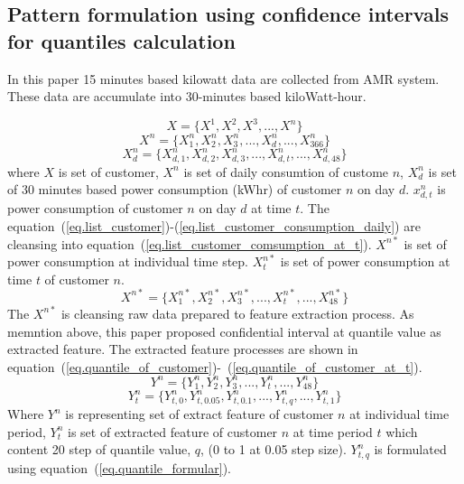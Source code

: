 \documentclass[conference]{IEEEtran}
\begin{document}
\subsection{Pattern formulation using confidence intervals for quantiles calculation}
In this paper 15 minutes based kilowatt data are collected from AMR system. These data are accumulate into 30-minutes based kiloWatt-hour.

\begin{equation}
X=\big\{ X^{1}, X^{2}, X^{3}, ..., X^{n} \big\}
\label{eq.list_customer}
\end{equation}
\begin{equation}
X^{n}=\big\{ X_{1}^{n}, X_{2}^{n}, X_{3}^{n}, ...,X_{d}^{n},..., X_{366}^{n}\big\}
\label{eq.list_customer_consumption}
\end{equation}
\begin{equation}
X_{d}^{n}=\big\{ X_{d,1}^{n}, X_{d,2}^{n}, X_{d,3}^{n}, ...,X_{d,t}^{n},..., X_{d,48}^{n}\big\}
\label{eq.list_customer_consumption_daily}
\end{equation}
where $X$ is set of customer, $X^{n}$ is set of daily consumtion of custome $n$, $X_{d}^n$ is set of 30 minutes based power consumption (kWhr) of customer $n$ on day $d$. $x_{d,t}^{n}$ is power consumption of customer $n$ on day $d$ at time $t$.
The equation~(\ref{eq.list_customer})-(\ref{eq.list_customer_consumption_daily}) are cleansing into equation~(\ref{eq.list_customer_comsumption_at_t}).
$X^{n*}$ is set of power consumption at individual time step. $X_{t}^{n*}$ is set of power consumption at time $t$ of customer $n$.
\begin{equation}
X^{n*}=\big\{ X_{1}^{n*}, X_{2}^{n*}, X_{3}^{n*}, ..., X_{t}^{n*}, ..., X_{48}^{n*} \big\}
\label{eq.list_customer_comsumption_at_t}
\end{equation}
The $X^{n*}$ is cleansing raw data prepared to feature extraction process. As memntion above, this paper proposed confidential interval at quantile value as extracted feature. The extracted feature processes are shown in equation~(\ref{eq.quantile_of_customer})-~(\ref{eq.quantile_of_customer_at_t}).
\begin{equation}
  Y^{n}=\big\{ Y_{1}^{n}, Y_{2}^{n}, Y_{3}^{n}, ..., Y_{t}^{n}, ..., Y_{48}^{n} \big\}
  \label{eq.quantile_of_customer}
\end{equation}
\begin{equation}
  Y_{t}^{n}=\big\{ Y_{t,0}^{n}, Y_{t,0.05}^{n}, Y_{t,0.1}^{n}, ..., Y_{t,q}^{n}, ..., Y_{t,1}^{n} \big\}
  \label{eq.quantile_of_customer_at_t}
\end{equation}
Where $Y^{n}$ is representing set of extract feature of customer $n$ at individual time period, $Y_{t}^{n}$ is set of extracted feature of customer $n$ at time period $t$ which content 20 step of quantile value, $q$, (0 to 1 at 0.05 step size).
$Y_{t,q}^{n}$ is formulated using equation~(\ref{eq.quantile_formular}).
\end{document}
